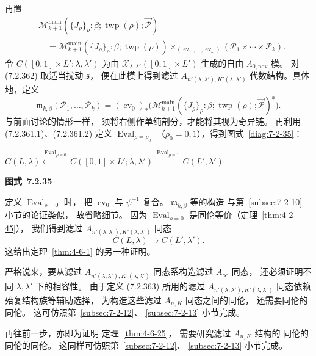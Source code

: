 再置
\begin{equation}
\begin{aligned}
&\mathcal M^{\mathrm{main}}_{k+1}
(\{J_\rho\}_\rho:\beta;
\operatorname{twp}(\rho);\vec{\mathcal P})\\
&\quad=\mathcal M^{\mathrm{main}}_{k+1}
(\{J_\rho\}_\rho:\beta;
\operatorname{twp}(\rho))
\mathbin{\times_{(\operatorname{ev}_1,\ldots,
\operatorname{ev}_k)}}
(\mathcal P_1\times\cdots\times\mathcal P_k).
\end{aligned}
\tag{7.2.362}\label{eq:7-2-362}
\end{equation}
令 $C([0,1]\times L';\lambda,\lambda')$
为由 $\mathcal X_{\lambda,\lambda'}
([0,1]\times L')$ 生成的自由
$\Lambda_{0,\mathrm{nov}}$ 模。
对 (7.2.362) 取适当扰动 $\mathfrak s$，
便在此模上得到滤过
$A_{n'(\lambda,\lambda'),K'(\lambda,\lambda')}$
代数结构。具体地，定义
\[
\mathfrak m_{k,\beta}
(\mathcal P_1,\ldots,\mathcal P_k)
=(\operatorname{ev}_0)_*\bigl(
\mathcal M^{\mathrm{main}}_{k+1}
(\{J_\rho\}_\rho:\beta;
\operatorname{twp}(\rho);\vec{\mathcal P})^{\mathfrak s}
\bigr).
\]
与前面讨论的情形一样，
须将右侧作单纯剖分，才能将其视为奇异链。
再利用 (7.2.361.1)、(7.2.361.2)
定义 $\operatorname{Eval}_{\rho=\rho_0}$
（$\rho_0=0,1$），得到图式~\ref{diag:7-2-35}：

\par\medskip\noindent\begin{minipage}{\textwidth}
\centering
$C(L,\lambda)
\xleftarrow{\ \operatorname{Eval}_{\rho=0}\ }
C([0,1]\times L';\lambda,\lambda')
\xrightarrow{\ \operatorname{Eval}_{\rho=1}\ }
C(L',\lambda')$
\par\smallskip
{\renewcommand{\thefigure}{7.2.35}
\normalfont\bfseries 图式~\thefigure\label{diag:7-2-35}}
\end{minipage}\par\medskip

定义 $\operatorname{Eval}_{\rho=0}$ 时，
把 $\operatorname{ev}_0$ 与 $\psi^{-1}$ 复合。
$\mathfrak m_{k,\beta}$ 等的构造
与第~\ref{subsec:7-2-10} 小节的论证类似，
故省略细节。
因为 $\operatorname{Eval}_{\rho=0}$
是同伦等价（定理~\ref{thm:4-2-45}），
我们得到滤过
$A_{n'(\lambda,\lambda'),K'(\lambda,\lambda')}$
同态
\begin{equation}
C(L,\lambda)\longrightarrow C(L',\lambda').
\tag{7.2.363}\label{eq:7-2-363}
\end{equation}
这给出定理~\ref{thm:4-6-1} 的另一种证明。

严格说来，要从滤过
$A_{n'(\lambda,\lambda'),K'(\lambda,\lambda')}$
同态系构造滤过 $A_\infty$ 同态，
还必须证明不同 $\lambda,\lambda'$ 下的相容性。
由于定义 (7.2.363) 所用的滤过
$A_{n'(\lambda,\lambda'),K'(\lambda,\lambda')}$
同态依赖殆复结构族等辅助选择，
为构造这些滤过 $A_{n,K}$ 同态之间的同伦，
还需要同伦的同伦。
这可仿照第~\ref{subsec:7-2-12}、
\ref{subsec:7-2-13} 小节完成。

再往前一步，亦即为证明
定理~\ref{thm:4-6-25}，
需要研究滤过 $A_{n,K}$ 结构的
同伦的同伦的同伦。
这同样可仿照第~\ref{subsec:7-2-12}、
\ref{subsec:7-2-13} 小节完成。

